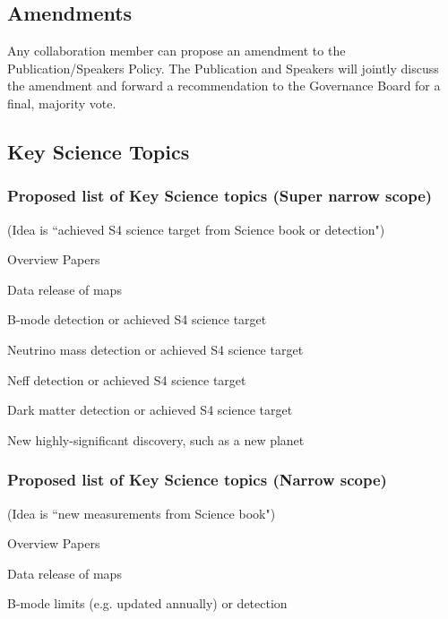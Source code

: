 \subsection{Amendments}
Any collaboration member can propose an amendment to the Publication/Speakers Policy. The Publication and Speakers will jointly discuss the amendment and forward a recommendation to the Governance Board for a final, majority vote.









\subsection{Key Science Topics}

\subsubsection{Proposed list of Key Science topics (Super narrow scope)}

(Idea is ``achieved S4 science target from Science book or detection")

Overview Papers

Data release of maps

B-mode detection or achieved S4 science target

Neutrino mass detection or achieved S4 science target

Neff detection or achieved S4 science target

Dark matter detection or achieved S4 science target 

New highly-significant discovery, such as a new planet

\subsubsection{Proposed list of Key Science topics (Narrow scope)} 

(Idea is ``new measurements from Science book")

Overview Papers

Data release of maps

B-mode limits (e.g. updated annually) or detection

